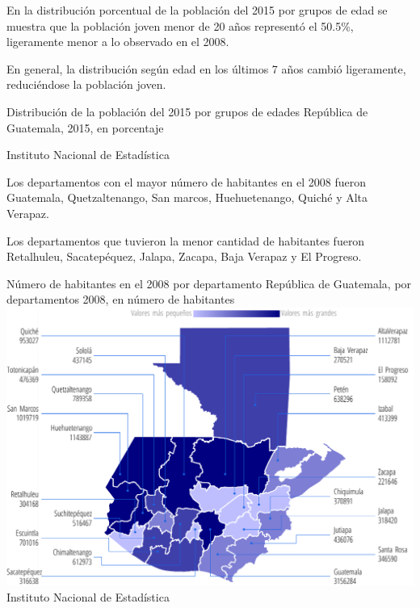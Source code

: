  
 {%
En la distribución porcentual de la población del 2015 por grupos de edad se muestra que la población joven menor de 20 años representó el 50.5\%, ligeramente menor a lo observado en el 2008. 

En general, la distribución según edad en los últimos 7 años cambió ligeramente, reduciéndose la población joven. }%
 {%
 	Distribución de la población del 2015 por grupos de edades} %
 {%
 	República de Guatemala, 2015, en porcentaje} %
 {%
 	\begin{tikzpicture}[x=1pt,y=1pt]    \end{tikzpicture}}%
 {%
 	Instituto Nacional de Estadística} %
 
 
 
  
  {%
 Los departamentos con el mayor número de habitantes en el 2008 fueron Guatemala, Quetzaltenango, San marcos, Huehuetenango, Quiché y Alta Verapaz.
 
 Los departamentos que tuvieron la menor cantidad de habitantes fueron Retalhuleu, Sacatepéquez, Jalapa, Zacapa, Baja Verapaz y El Progreso. }%
  {%
  	Número de habitantes en el 2008 por departamento
  	} %
  {%
  	República de Guatemala, por departamentos 2008, en número de habitantes} %
  {%
  	 \includegraphics[width=52\cuadri]{graficas/1_02.pdf}}%
  {%
  	Instituto Nacional de Estadística} %
  
  
   
